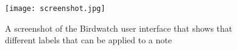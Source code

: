 \documentclass [11pt, proquest] {uwthesis}[2020/02/24]
\newenvironment{demo}
  {\begin{alltt}\leftskip3em
     \def\\{\ttfamily\char`\\}%
     \def\{{\ttfamily\char`\{}%
     \def\}{\ttfamily\char`\}}}
  {\end{alltt}}
\begin{document}













%
\nocite{*}   %
% 


%
%
\appendix
\chapter{}
\raggedbottom\sloppy
 \begin{figure}[h]
\centering
\texttt{[image: screenshot.jpg]}
\caption{A screenshot of the Birdwatch user interface that shows that different labels that can be applied to a note }
\label{fig:labels}
\end{figure}
\end{document}
